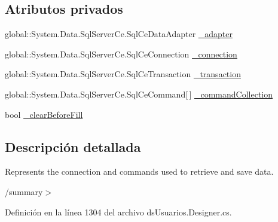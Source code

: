 \subsection*{Atributos privados}
\begin{DoxyCompactItemize}
\item 
global\-::\-System.\-Data.\-Sql\-Server\-Ce.\-Sql\-Ce\-Data\-Adapter \hyperlink{class_proyecto___integrador__3_1_1ds_usuarios_table_adapters_1_1_usuarios_table_adapter_ab48b9b83ce2db01dbbc83ad45b428a80}{\-\_\-adapter}
\item 
global\-::\-System.\-Data.\-Sql\-Server\-Ce.\-Sql\-Ce\-Connection \hyperlink{class_proyecto___integrador__3_1_1ds_usuarios_table_adapters_1_1_usuarios_table_adapter_a0250533a5325c3381c6c4e82d364aa9d}{\-\_\-connection}
\item 
global\-::\-System.\-Data.\-Sql\-Server\-Ce.\-Sql\-Ce\-Transaction \hyperlink{class_proyecto___integrador__3_1_1ds_usuarios_table_adapters_1_1_usuarios_table_adapter_a190d15c8d49c6f2014c79e83efc26011}{\-\_\-transaction}
\item 
global\-::\-System.\-Data.\-Sql\-Server\-Ce.\-Sql\-Ce\-Command\mbox{[}$\,$\mbox{]} \hyperlink{class_proyecto___integrador__3_1_1ds_usuarios_table_adapters_1_1_usuarios_table_adapter_a75eb89ec1d18b81a4b7301b99894478e}{\-\_\-command\-Collection}
\item 
bool \hyperlink{class_proyecto___integrador__3_1_1ds_usuarios_table_adapters_1_1_usuarios_table_adapter_a3895271a2af9b0afa87a2b69ee6b5826}{\-\_\-clear\-Before\-Fill}
\end{DoxyCompactItemize}


\subsection{Descripción detallada}
Represents the connection and commands used to retrieve and save data. 

/summary$>$ 

Definición en la línea 1304 del archivo ds\-Usuarios.\-Designer.\-cs.



